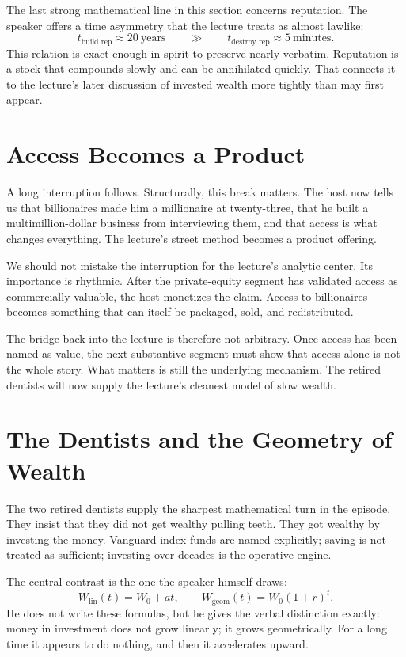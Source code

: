 The last strong mathematical line in this section concerns reputation. The speaker offers a time asymmetry that the lecture treats as almost lawlike:
\begin{equation}
t_{\text{build rep}} \approx 20\ \text{years}
\qquad \gg \qquad
t_{\text{destroy rep}} \approx 5\ \text{minutes}.
\end{equation}
This relation is exact enough in spirit to preserve nearly verbatim. Reputation is a stock that compounds slowly and can be annihilated quickly. That connects it to the lecture's later discussion of invested wealth more tightly than may first appear.

\section{Access Becomes a Product}

A long interruption follows. Structurally, this break matters. The host now tells us that billionaires made him a millionaire at twenty-three, that he built a multimillion-dollar business from interviewing them, and that access is what changes everything. The lecture's street method becomes a product offering.

We should not mistake the interruption for the lecture's analytic center. Its importance is rhythmic. After the private-equity segment has validated access as commercially valuable, the host monetizes the claim. Access to billionaires becomes something that can itself be packaged, sold, and redistributed.

The bridge back into the lecture is therefore not arbitrary. Once access has been named as value, the next substantive segment must show that access alone is not the whole story. What matters is still the underlying mechanism. The retired dentists will now supply the lecture's cleanest model of slow wealth.

\section{The Dentists and the Geometry of Wealth}

The two retired dentists supply the sharpest mathematical turn in the episode. They insist that they did not get wealthy pulling teeth. They got wealthy by investing the money. Vanguard index funds are named explicitly; saving is not treated as sufficient; investing over decades is the operative engine.

The central contrast is the one the speaker himself draws:
\begin{equation}
W_{\text{lin}}(t) = W_0 + at,
\qquad
W_{\text{geom}}(t) = W_0(1+r)^t.
\end{equation}
He does not write these formulas, but he gives the verbal distinction exactly: money in investment does not grow linearly; it grows geometrically. For a long time it appears to do nothing, and then it accelerates upward.

